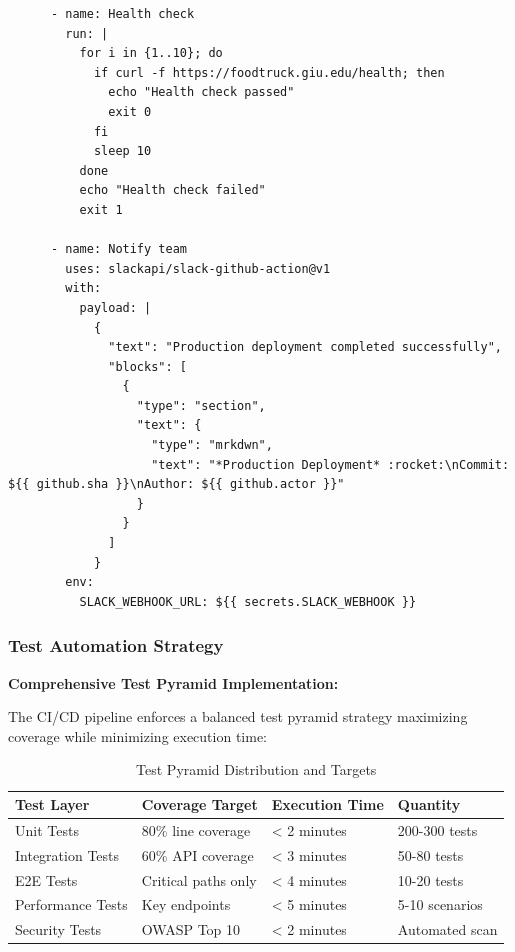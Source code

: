 \documentclass[12pt,a4paper]{article}
\begin{document}
\begin{verbatim}
      - name: Health check
        run: |
          for i in {1..10}; do
            if curl -f https://foodtruck.giu.edu/health; then
              echo "Health check passed"
              exit 0
            fi
            sleep 10
          done
          echo "Health check failed"
          exit 1
      
      - name: Notify team
        uses: slackapi/slack-github-action@v1
        with:
          payload: |
            {
              "text": "Production deployment completed successfully",
              "blocks": [
                {
                  "type": "section",
                  "text": {
                    "type": "mrkdwn",
                    "text": "*Production Deployment* :rocket:\nCommit: ${{ github.sha }}\nAuthor: ${{ github.actor }}"
                  }
                }
              ]
            }
        env:
          SLACK_WEBHOOK_URL: ${{ secrets.SLACK_WEBHOOK }}
\end{verbatim}

\subsubsection{Test Automation Strategy}

\textbf{Comprehensive Test Pyramid Implementation:}

The CI/CD pipeline enforces a balanced test pyramid strategy maximizing coverage while minimizing execution time:

\begin{table}[H]
\centering
\begin{tabular}{|p{3cm}|p{4cm}|p{4cm}|p{2cm}|}
\hline
\textbf{Test Layer} & \textbf{Coverage Target} & \textbf{Execution Time} & \textbf{Quantity} \\
\hline
Unit Tests & 80\% line coverage & < 2 minutes & 200-300 tests \\
\hline
Integration Tests & 60\% API coverage & < 3 minutes & 50-80 tests \\
\hline
E2E Tests & Critical paths only & < 4 minutes & 10-20 tests \\
\hline
Performance Tests & Key endpoints & < 5 minutes & 5-10 scenarios \\
\hline
Security Tests & OWASP Top 10 & < 2 minutes & Automated scan \\
\hline
\end{tabular}
\caption{Test Pyramid Distribution and Targets}
\end{table}

\vspace{0.5em}
\end{document}
